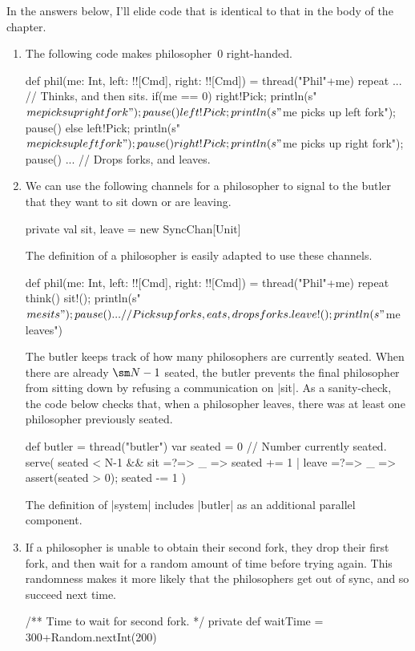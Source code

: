\begin{answerI}
In the answers below, I'll elide code that is identical to that in the body of
the chapter.

\begin{enumerate}
\item
The following code makes philosopher~$0$ right-handed.
%
\begin{scala}
  def phil(me: Int, left: !![Cmd], right: !![Cmd]) = thread("Phil"+me){
    repeat{
      ... // Thinks, and then sits.
      if(me == 0){
        right!Pick; println(s"$me picks up right fork"); pause()
        left!Pick; println(s"$me picks up left fork"); pause()
      }
      else{
        left!Pick; println(s"$me picks up left fork"); pause()
        right!Pick; println(s"$me picks up right fork"); pause()
      }
      ... // Drops forks, and leaves.
    }
  }
\end{scala}


\item We can use the following channels for a philosopher to signal to the
  butler that they want to sit down or are leaving.
\begin{scala}
  private val sit, leave = new SyncChan[Unit]
\end{scala}
%
The definition of a philosopher is easily adapted to use these channels.%
\begin{scala}
  def phil(me: Int, left: !![Cmd], right: !![Cmd]) = thread("Phil"+me){
    repeat{
      think()
      sit!(); println(s"$me sits"); pause()
      ... // Picks up forks, eats, drops forks.
      leave!(); println(s"$me leaves")
    }
  }
\end{scala}
%
The butler keeps track of how many philosophers are currently seated.  When
there are already $\sm N - 1$ seated, the butler prevents the final
philosopher from sitting down by refusing a communication on |sit|.  As a
sanity-check, the code below checks that, when a philosopher leaves, there was
at least one philosopher previously seated.
%
\begin{scala}
   def butler = thread("butler"){
    var seated = 0 // Number currently seated.
    serve(
      seated < N-1 && sit =?=> { _ => seated += 1 }
      | leave =?=> { _ => assert(seated > 0); seated -= 1 }
    )
  }
\end{scala}
%
The definition of |system| includes |butler| as an additional parallel
component. 


\item
If a philosopher is unable to obtain their second fork, they drop their first
fork, and then wait for a random amount of time before trying again.  This
randomness makes it more likely that the philosophers get out of sync, and so
succeed next time.  
%
\begin{scala}
  /** Time to wait for second fork. */
  private def waitTime = 300+Random.nextInt(200)


\end{scala}
\end{enumerate}
\end{answerI}
